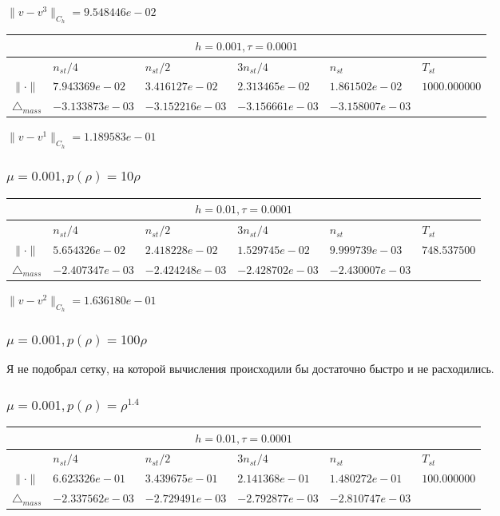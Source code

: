 $\|v-v^{3}\|_{C_h} = 9.548446e-02$

\begin{tabular}{*{6}{|l}|}
    \hline
     \\
    \hline
    &$n_{st}/4 $&$ n_{st}/2$&$3n_{st}/4$&$n_{st}$&$T_{st}$ \\
    \hline
$\|\cdot \|$& $7.943369e-02$ & $3.416127e-02$ & $2.313465e-02$ & $1.861502e-02$ &$1000.000000$\\
\hline
$\triangle_{mass}$& $-3.133873e-03$ & $-3.152216e-03$ & $-3.156661e-03$ & $-3.158007e-03$ &\\
\hline   
   \end{tabular}

$\|v-v^{1}\|_{C_h} = 1.189583e-01$

\subsubsection{$\mu = 0.001, p(\rho) = 10\rho $}

\begin{tabular}{*{6}{|l}|}
    \hline
     \\
    \hline
    &$n_{st}/4 $&$ n_{st}/2$&$3n_{st}/4$&$n_{st}$&$T_{st}$ \\
    \hline
$\|\cdot \|$& $5.654326e-02$ & $2.418228e-02$ & $1.529745e-02$ & $9.999739e-03$ &$748.537500$\\
\hline
$\triangle_{mass}$& $-2.407347e-03$ & $-2.424248e-03$ & $-2.428702e-03$ & $-2.430007e-03$ &\\
\hline
\end{tabular}

$\|v-v^{2}\|_{C_h} = 1.636180e-01$

\subsubsection{$\mu = 0.001, p(\rho) = 100\rho $}

Я не подобрал сетку, на которой вычисления происходили бы достаточно быстро и не расходились.

\subsubsection{$\mu = 0.001, p(\rho) = \rho^{1.4} $}
\begin{tabular}{*{6}{|l}|}
    \hline
     \\
    \hline
    &$n_{st}/4 $&$ n_{st}/2$&$3n_{st}/4$&$n_{st}$&$T_{st}$ \\
    \hline
    $\|\cdot \|$& $6.623326e-01$ & $3.439675e-01$ & $2.141368e-01$ & $1.480272e-01$ &$100.000000$\\
\hline
$\triangle_{mass}$& $-2.337562e-03$ & $-2.729491e-03$ & $-2.792877e-03$ & $-2.810747e-03$ &\\
\hline
\end{tabular}

